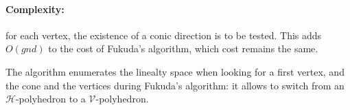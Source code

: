 \paragraph{Complexity:} for each vertex, the existence of a conic direction is to be tested. This adds $O(gnd)$ to the cost of Fukuda's algorithm, which cost remains the same.

The algorithm enumerates the linealty space when looking for a first vertex, and the cone and the vertices during Fukuda's algorithm: it allows to switch from an $\mathcal{H}$-polyhedron to a $\mathcal{V}$-polyhedron.



